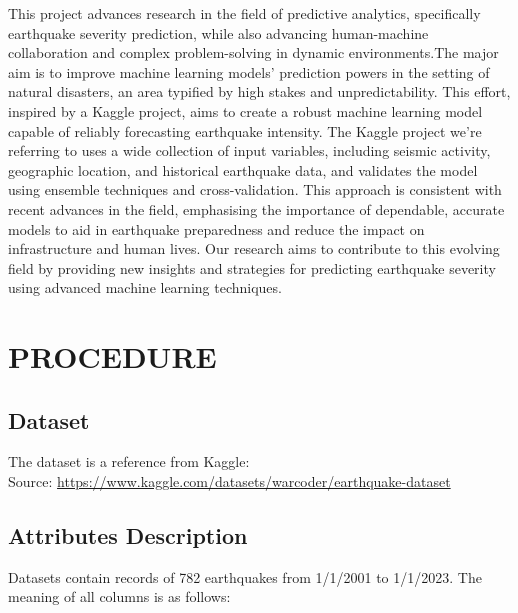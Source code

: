 \documentclass{article}
\begin{document}
This project advances research in the field of predictive analytics, specifically earthquake severity prediction, while also advancing human-machine collaboration and complex problem-solving in dynamic environments.The major aim is to improve machine learning models' prediction powers in the setting of natural disasters, an area typified by high stakes and unpredictability. This effort, inspired by a Kaggle project, aims to create a robust machine learning model capable of reliably forecasting earthquake intensity. The Kaggle project we're referring to uses a wide collection of input variables, including seismic activity, geographic location, and historical earthquake data, and validates the model using ensemble techniques and cross-validation. This approach is consistent with recent advances in the field, emphasising the importance of dependable, accurate models to aid in earthquake preparedness and reduce the impact on infrastructure and human lives. Our research aims to contribute to this evolving field by providing new insights and strategies for predicting earthquake severity using advanced machine learning techniques.


\section{PROCEDURE}

\subsection{Dataset}

The dataset is a reference from Kaggle:\\
Source: \url{https://www.kaggle.com/datasets/warcoder/earthquake-dataset}

\subsection{Attributes Description}
Datasets contain records of 782 earthquakes from 1/1/2001 to 1/1/2023. The meaning of all columns is as follows:
\end{document}
